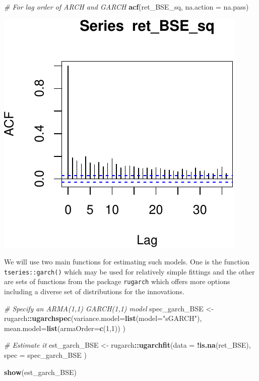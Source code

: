 \documentclass[11pt,]{article}
\newenvironment{Shaded}{\begin{snugshade}}{\end{snugshade}}
\newcommand{\KeywordTok}[1]{\textcolor[rgb]{0.13,0.29,0.53}{\textbf{#1}}}
\newcommand{\DataTypeTok}[1]{\textcolor[rgb]{0.13,0.29,0.53}{#1}}
\newcommand{\DecValTok}[1]{\textcolor[rgb]{0.00,0.00,0.81}{#1}}
\newcommand{\StringTok}[1]{\textcolor[rgb]{0.31,0.60,0.02}{#1}}
\newcommand{\CommentTok}[1]{\textcolor[rgb]{0.56,0.35,0.01}{\textit{#1}}}
\newcommand{\OperatorTok}[1]{\textcolor[rgb]{0.81,0.36,0.00}{\textbf{#1}}}
\newcommand{\NormalTok}[1]{#1}
\begin{document}
\begin{Shaded}
\begin{Highlighting}[]
\CommentTok{# For lag order of ARCH and GARCH}
\KeywordTok{acf}\NormalTok{(ret_BSE_sq, }\DataTypeTok{na.action =}\NormalTok{ na.pass)}
\end{Highlighting}
\end{Shaded}

\begin{center}\includegraphics{FMC_T4_PhD_ARMA_GARCH_files/figure-latex/BSE_fit_ARMA_GARCH_ACF-3} \end{center}

We will use two main functions for estimating such models. One is the
function \texttt{tseries::garch()} which may be used for relatively
simple fittings and the other are sets of functions from the package
\texttt{rugarch} which offers more options including a diverse set of
distributions for the innovations.

\begin{Shaded}
\begin{Highlighting}[]
\CommentTok{# Specify an ARMA(1,1) GARCH(1,1) model}
\NormalTok{spec_garch_BSE <-}\StringTok{ }\NormalTok{rugarch}\OperatorTok{::}\KeywordTok{ugarchspec}\NormalTok{(}\DataTypeTok{variance.model=}\KeywordTok{list}\NormalTok{(}\DataTypeTok{model=}\StringTok{"sGARCH"}\NormalTok{),}
                                      \DataTypeTok{mean.model=}\KeywordTok{list}\NormalTok{(}\DataTypeTok{armaOrder=}\KeywordTok{c}\NormalTok{(}\DecValTok{1}\NormalTok{,}\DecValTok{1}\NormalTok{))}
\NormalTok{                                      )}

\CommentTok{# Estimate it}
\NormalTok{est_garch_BSE <-}\StringTok{ }\NormalTok{rugarch}\OperatorTok{::}\KeywordTok{ugarchfit}\NormalTok{(}\DataTypeTok{data =} \OperatorTok{!}\KeywordTok{is.na}\NormalTok{(ret_BSE),}
                                    \DataTypeTok{spec =}\NormalTok{ spec_garch_BSE}
\NormalTok{                                    )}

\KeywordTok{show}\NormalTok{(est_garch_BSE)}
\end{Highlighting}
\end{Shaded}
\end{document}

